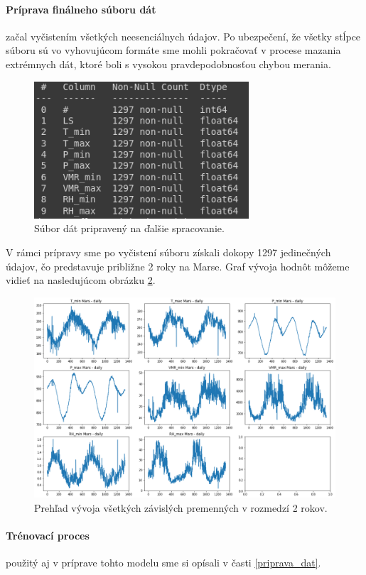 \paragraph{Príprava finálneho súboru dát} začal vyčistením všetkých neesenciálnych údajov. Po ubezpečení, že všetky stĺpce súboru sú vo vyhovujúcom formáte sme mohli pokračovať v procese mazania extrémnych dát, ktoré boli s vysokou pravdepodobnosťou chybou merania. 
\begin{figure}[!htbp]
  \centering
  \includegraphics[width=8cm]{img/df_final.png}
  \caption{Súbor dát pripravený na ďalšie spracovanie.}
  \label{dest_abs_error}
\end{figure}

V rámci prípravy sme po vyčistení súboru získali dokopy 1297 jedinečných údajov, čo predstavuje približne 2 roky na Marse. Graf vývoja hodnôt môžeme vidieť na nasledujúcom obrázku \ref{features1}.
\begin{figure}[!htbp]
  \centering
  \includegraphics[width=14cm]{img/features1.png}
  \caption{Prehľad vývoja všetkých závislých premenných v rozmedzí 2 rokov.}
  \label{features1}
\end{figure}

\paragraph{Trénovací proces} použitý aj v príprave tohto modelu sme si opísali v časti \ref{priprava_dat}.

